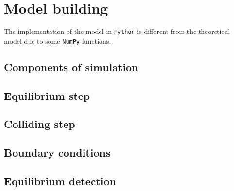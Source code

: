 \chapter{Model building}

The implementation of the model in \texttt{Python} is different from the theoretical model due to some \texttt{NumPy} functions.


\section{Components of simulation}

\section{Equilibrium step}

\section{Colliding step}

\section{Boundary conditions}

\section{Equilibrium detection}
